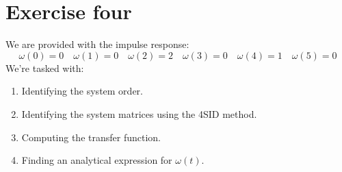 \section{Exercise four}

We are provided with the impulse response:
\[\omega(0)=0 \quad \omega(1)=0 \quad \omega(2)=2 \quad \omega(3)=0 \quad \omega(4)=1 \quad \omega(5)=0\]
We're tasked with:
\begin{enumerate}
    \item Identifying the system order.
    \item Identifying the system matrices using the 4SID method.
    \item Computing the transfer function.
    \item Finding an analytical expression for $\omega(t)$.
\end{enumerate}

